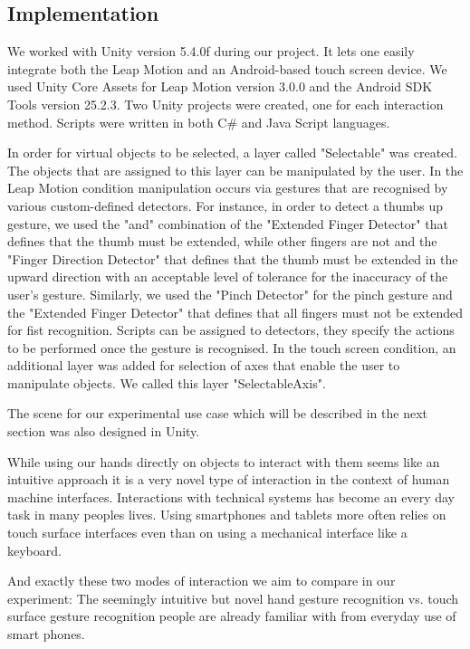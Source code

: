 \subsection{Implementation}

We worked with Unity version 5.4.0f during our project. It lets one easily integrate both the Leap Motion and an Android-based touch screen device. We used Unity Core Assets for Leap Motion version 3.0.0 and the Android SDK Tools version 25.2.3. Two Unity projects were created, one for each interaction method. Scripts were written in both C{\#} and Java Script languages.

In order for virtual objects to be selected, a layer called "Selectable" was created. The objects that are assigned to this layer can be manipulated by the user. In the Leap Motion condition manipulation occurs via gestures that are recognised by various custom-defined detectors. For instance, in order to detect a thumbs up gesture, we used the "and" combination of the "Extended Finger Detector" that defines that the thumb must be extended, while other fingers are not and the "Finger Direction Detector" that defines that the thumb must be extended in the upward direction with an acceptable level of tolerance for the inaccuracy of the user's gesture. Similarly, we used the "Pinch Detector" for the pinch gesture and the "Extended Finger Detector" that defines that all fingers must not be extended for fist recognition. Scripts can be assigned to detectors, they specify the actions to be performed once the gesture is recognised. In the touch screen condition, an additional layer was added for selection of axes that enable the user to manipulate objects. We called this layer "SelectableAxis".

The scene for our experimental use case which will be described in the next section was also designed in Unity.

\iffalse
While using our hands directly on objects to interact with them seems like an intuitive approach it is a very novel type of interaction in the context of human machine interfaces.
Interactions with technical systems has become an every day task in many peoples lives.
Using smartphones and tablets more often relies on touch surface interfaces even than on using a mechanical interface like a keyboard.

And exactly these two modes of interaction we aim to compare in our experiment:
The seemingly intuitive but novel hand gesture recognition vs. touch surface gesture recognition people are already familiar with from everyday use of smart phones.

